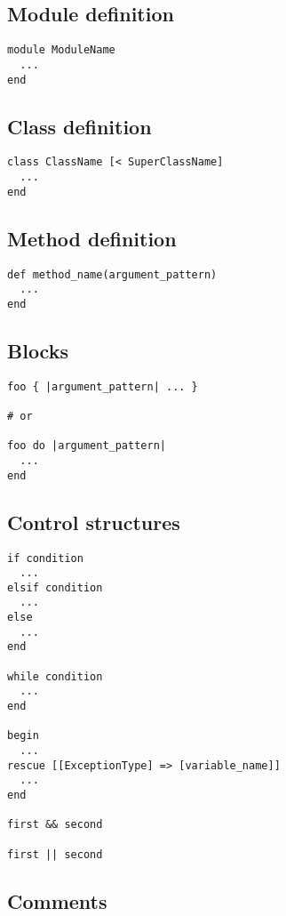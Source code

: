 \subsection{Module definition}

\begin{lstlisting}
module ModuleName
  ...
end
\end{lstlisting}

\subsection{Class definition}

\begin{lstlisting}
class ClassName [< SuperClassName]
  ...
end
\end{lstlisting}

\subsection{Method definition}

\begin{lstlisting}
def method_name(argument_pattern)
  ...
end
\end{lstlisting}

\subsection{Blocks}

\begin{lstlisting}
foo { |argument_pattern| ... }

# or

foo do |argument_pattern|
  ...
end
\end{lstlisting}

\subsection{Control structures}

\begin{lstlisting}
if condition
  ...
elsif condition
  ...
else
  ...
end

while condition
  ...
end

begin
  ...
rescue [[ExceptionType] => [variable_name]]
  ...
end

first && second

first || second
\end{lstlisting}

\subsection{Comments}

